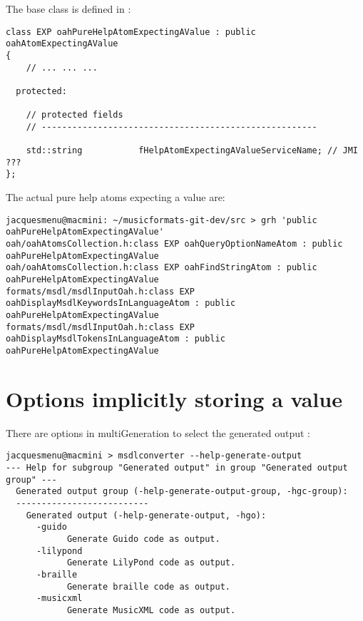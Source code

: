 The base  class   is defined in :
\begin{lstlisting}[language=CPlusPlus]
class EXP oahPureHelpAtomExpectingAValue : public oahAtomExpectingAValue
{
	// ... ... ...

  protected:

    // protected fields
    // ------------------------------------------------------

    std::string           fHelpAtomExpectingAValueServiceName; // JMI ???
};

\end{lstlisting}

The actual pure help atoms expecting a value are:
\begin{lstlisting}[language=Terminal]
jacquesmenu@macmini: ~/musicformats-git-dev/src > grh 'public oahPureHelpAtomExpectingAValue'
oah/oahAtomsCollection.h:class EXP oahQueryOptionNameAtom : public oahPureHelpAtomExpectingAValue
oah/oahAtomsCollection.h:class EXP oahFindStringAtom : public oahPureHelpAtomExpectingAValue
formats/msdl/msdlInputOah.h:class EXP oahDisplayMsdlKeywordsInLanguageAtom : public oahPureHelpAtomExpectingAValue
formats/msdl/msdlInputOah.h:class EXP oahDisplayMsdlTokensInLanguageAtom : public oahPureHelpAtomExpectingAValue
\end{lstlisting}


\section{Options implicitly storing a value}

There are options in multiGeneration to select the generated output :
\begin{lstlisting}[language=Terminal]
jacquesmenu@macmini > msdlconverter --help-generate-output
--- Help for subgroup "Generated output" in group "Generated output group" ---
  Generated output group (-help-generate-output-group, -hgc-group):
  --------------------------
    Generated output (-help-generate-output, -hgo):
      -guido
            Generate Guido code as output.
      -lilypond
            Generate LilyPond code as output.
      -braille
            Generate braille code as output.
      -musicxml
            Generate MusicXML code as output.
\end{lstlisting}


